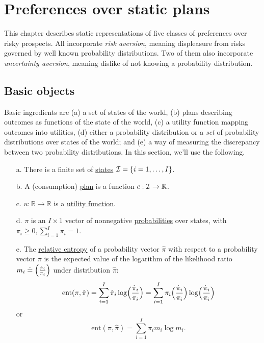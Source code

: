 
\chapter{Preferences over static plans\label{sec:decisiontheory}}
%
This chapter describes  static representations of five classes of preferences over risky prospects. All  incorporate
{\em risk aversion}, meaning displeasure from
 risks governed by  well known probability distributions.  Two
of them also incorporate  {\em uncertainty aversion}, meaning  dislike of not knowing a  probability distribution.


\section{Basic objects\label{sec:decisiontheory2}}

Basic ingredients are (a) a set of states of the world, (b) plans describing outcomes as functions
of the state of the world, (c) a  utility  function mapping outcomes into utilities, (d) either a probability distribution or a \textit{set\/}
of probability distributions over states of the world; and (e) a way of measuring the discrepancy between two probability distributions.
In this section, we'll use the following.
\begin{itemize}
 \item[a.] There is a  finite set of \underline{states} ${\cal I} = \{i= 1, \ldots, I\}$.
 \item[b.] A (consumption) \underline{plan} is a function $c: {\cal I} \rightarrow {\mathbb R}$.  
 \item[c.] $u: {\mathbb R} \rightarrow {\mathbb R}$ is a \underline{utility function}.
 \item[d.] $\pi$ is an $I \times 1$ vector of nonnegative
\underline{probabilities} over  states, with $\pi_ i \geq 0, \sum_{i=1}^I \pi_i = 1$.
 \item[e.] The \underline{relative entropy} of a probability vector  $\hat \pi$ with respect to a probability vector $\pi$
is the expected value of the logarithm of the  likelihood ratio $m_i \doteq \Bigl( \frac{\hat \pi_i}{\pi_i} \Bigr) $
 under   distribution $\hat \pi$:
\[ \textrm{ent}(\pi, \hat \pi) = \sum_{i=1}^I \hat \pi_i  \log \Bigl( \frac{\hat \pi_i}{\pi_i} \Bigr)   = \sum_{i=1}^I \pi_i \Bigl( \frac{\hat \pi_i}{\pi_i} \Bigr) \log \Bigl( \frac{\hat \pi_i}{\pi_i} \Bigr)   \]
or
 \begin{equation} \label{eqn:def_ent}
    \textrm{ent}(\pi, \hat \pi) = \sum_{i=1}^I \pi_i m_i \log m_i  . \end{equation}
\end{itemize}

